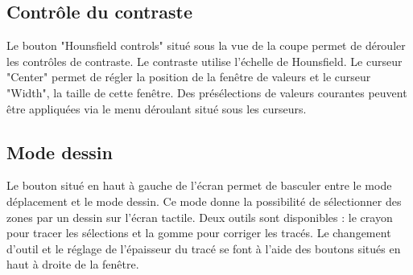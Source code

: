 \subsection{Contrôle du contraste}
Le bouton "Hounsfield controls" situé sous la vue de la coupe permet de dérouler les contrôles de contraste. Le contraste utilise l'échelle de Hounsfield. Le curseur "Center" permet de régler la position de la fenêtre de valeurs et le curseur "Width", la taille de cette fenêtre. Des présélections de valeurs courantes peuvent être appliquées via le menu déroulant situé sous les curseurs.

\subsection{Mode dessin}
Le bouton situé en haut à gauche de l'écran permet de basculer entre le mode déplacement et le mode dessin. Ce mode donne la possibilité de sélectionner des zones par un dessin sur l'écran tactile. Deux outils sont disponibles : le crayon pour tracer les sélections et la gomme pour corriger les tracés. Le changement d'outil et le réglage de l'épaisseur du tracé se font à l'aide des boutons situés en haut à droite de la fenêtre.
